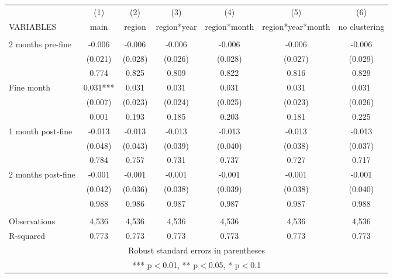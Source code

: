 \begin{tabular}{lcccccc} \hline
 & (1) & (2) & (3) & (4) & (5) & (6) \\
VARIABLES & main & region & region*year & region*month & region*year*month & no clustering \\ \hline
 &  &  &  &  &  &  \\
2 months pre-fine & -0.006 & -0.006 & -0.006 & -0.006 & -0.006 & -0.006 \\
 & (0.021) & (0.028) & (0.026) & (0.028) & (0.027) & (0.029) \\
 & 0.774 & 0.825 & 0.809 & 0.822 & 0.816 & 0.829 \\
Fine month & 0.031*** & 0.031 & 0.031 & 0.031 & 0.031 & 0.031 \\
 & (0.007) & (0.023) & (0.024) & (0.025) & (0.023) & (0.026) \\
 & 0.001 & 0.193 & 0.185 & 0.203 & 0.181 & 0.225 \\
1 month post-fine & -0.013 & -0.013 & -0.013 & -0.013 & -0.013 & -0.013 \\
 & (0.048) & (0.043) & (0.039) & (0.040) & (0.038) & (0.037) \\
 & 0.784 & 0.757 & 0.731 & 0.737 & 0.727 & 0.717 \\
2 months post-fine & -0.001 & -0.001 & -0.001 & -0.001 & -0.001 & -0.001 \\
 & (0.042) & (0.036) & (0.038) & (0.039) & (0.038) & (0.040) \\
 & 0.988 & 0.986 & 0.987 & 0.987 & 0.987 & 0.988 \\
 &  &  &  &  &  &  \\
Observations & 4,536 & 4,536 & 4,536 & 4,536 & 4,536 & 4,536 \\
 R-squared & 0.773 & 0.773 & 0.773 & 0.773 & 0.773 & 0.773 \\ \hline
\multicolumn{7}{c}{ Robust standard errors in parentheses} \\
\multicolumn{7}{c}{ *** p$<$0.01, ** p$<$0.05, * p$<$0.1} \\
\end{tabular}
